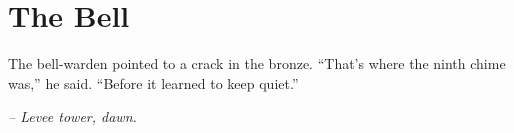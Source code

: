 \chapter*{The Bell}

The bell-warden pointed to a crack in the bronze. ``That's where the ninth chime was,'' he said. ``Before it learned to keep quiet.''

\smallskip

\noindent \textit{-- Levee tower, dawn.}

